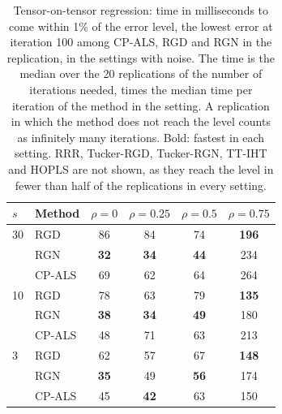 \begin{table}[!htbp]
\centering
\caption{Tensor-on-tensor regression: time in milliseconds to come within 1\% of the error level, the lowest error at iteration 100 among CP-ALS, RGD and RGN in the replication, in the settings with noise. The time is the median over the 20 replications of the number of iterations needed, times the median time per iteration of the method in the setting. A replication in which the method does not reach the level counts as infinitely many iterations. Bold: fastest in each setting. RRR, Tucker-RGD, Tucker-RGN, TT-IHT and HOPLS are not shown, as they reach the level in fewer than half of the replications in every setting.}
\label{tab:time_regression}
{\small
\begin{tabular}{llcccc}
\toprule
$s$ & Method & $\rho=0$ & $\rho=0.25$ & $\rho=0.5$ & $\rho=0.75$ \\
\midrule
30 & RGD & 86 & 84 & 74 & \textbf{196} \\
 & RGN & \textbf{32} & \textbf{34} & \textbf{44} & 234 \\
 & CP-ALS & 69 & 62 & 64 & 264 \\
\midrule
10 & RGD & 78 & 63 & 79 & \textbf{135} \\
 & RGN & \textbf{38} & \textbf{34} & \textbf{49} & 180 \\
 & CP-ALS & 48 & 71 & 63 & 213 \\
\midrule
3 & RGD & 62 & 57 & 67 & \textbf{148} \\
 & RGN & \textbf{35} & 49 & \textbf{56} & 174 \\
 & CP-ALS & 45 & \textbf{42} & 63 & 150 \\
\bottomrule
\end{tabular}}
\end{table}
